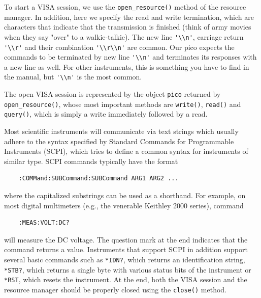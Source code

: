\documentclass{article}
\newcommand{\ls}[1]{\lstinline{#1}}
\newcounter{syntax}
\begin{document}
To start a VISA session, we use the \lstinline|open_resource()| method of the resource manager. In addition, here we specify the read and write termination, which are characters that indicate that the transmission is finished (think of army movies when they say "over" to a walkie-talkie). The new line \ls{'\\n'}, carriage return \ls{'\\r'} and their combination \ls{'\\r\\n'} are common. Our pico expects the commands to be terminated by new line \ls{'\\n'} and terminates its responses with a new line as well. For other instruments, this is something you have to find in the manual, but \ls{'\\n'} is the most common.

The open VISA session is represented by the object \ls{pico} returned by \ls{open_resource()}, whose most important methods are \ls{write()}, \ls{read()} and \ls{query()}, which is simply a write immediately followed by a read.

Most scientific instruments will communicate via text strings which usually adhere to the syntax specified by Standard Commands for Programmable Instruments (SCPI), which tries to define a common syntax for instruments of similar type. SCPI commands typically have the format
\begin{lstlisting}
    :COMMand:SUBCommand:SUBCommand ARG1 ARG2 ...
\end{lstlisting}
where the capitalized substrings can be used as a shorthand. For example, on most digital multimeters (e.g., the venerable Keithley 2000 series), command
\begin{lstlisting}
    :MEAS:VOLT:DC?
\end{lstlisting}
will measure the DC voltage. The question mark at the end indicates that the command returns a value. Instruments that support SCPI in addition support several basic commands such as \ls{*IDN?}, which returns an identification string, \ls{*STB?}, which returns a single byte with various status bits of the instrument or \ls{*RST}, which resets the instrument. At the end, both the VISA session and the resource manager should be properly closed using the \ls{close()} method.
\end{document}
